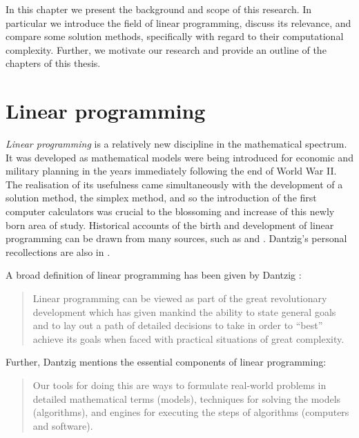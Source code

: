 
%
%
\label{ch:Introduction}

In this chapter we present the background and scope of
this research. In particular we introduce the field of linear programming,
discuss its relevance, and compare some solution methods, specifically
with regard to their computational complexity.
Further, we motivate our research and provide an outline of the chapters
of this thesis.

%
%
\section{Linear programming}

{\em Linear programming} is a relatively new discipline in the mathematical
spectrum.
It was developed as mathematical models were being introduced for
economic and military planning in the years immediately following
the end of World War II.
The realisation of its usefulness came simultaneously with the development
of a solution method, the simplex method, and so
the introduction of the first computer calculators was crucial to
the blossoming and increase of this newly born area of study. 
Historical accounts of the birth and development of linear programming 
can be drawn from many sources, such as \cite[Chapter~2]{Dantzig63} and 
\cite{Schrijver86}. Dantzig's personal recollections are also
in \cite{Dantzig02}.

A broad definition of linear programming has been given by 
Dantzig \cite{Dantzig02}:
\begin{quotation}
Linear programming can be viewed as part of the great revolutionary 
development which has given mankind the ability to state general goals
and to lay out a path of detailed decisions to take in order to ``best''
achieve its goals when faced with practical situations of great complexity.
\end{quotation}

Further, Dantzig \cite{Dantzig02} mentions the essential 
components of linear programming:
\begin{quotation}
Our tools for doing this are ways to formulate real-world problems in
detailed mathematical terms (models), techniques for solving the models
(algorithms), and engines for executing the steps of algorithms
(computers and software).
\end{quotation}

